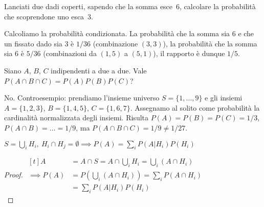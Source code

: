 
\begin{exercise}
	Lanciati due dadi coperti, sapendo che la somma esce~6, calcolare la probabilità che scoprendone uno esca~3.
\end{exercise}

\begin{solution}
	Calcoliamo la probabilità condizionata. La probabilità che la somma sia 6 e che un fissato dado sia 3 è $1/36$ (combinazione $(3,3)$), la probabilità che la somma sia 6 è $5/36$ (combinazioni da $(1,5)$ a $(5,1)$), il rapporto è dunque $1/5$.
\end{solution}

\begin{exercise}
	Siano $A$, $B$, $C$ indipendenti a due a due. Vale $P(A\cap B\cap C)=P(A)P(B)P(C)$?
\end{exercise}

\begin{solution}
	No. Controesempio: prendiamo l'insieme universo
	$S = \{1,\dots,9\}$
	e gli insiemi
	$A = \{1, 2, 3\}$,
	$B = \{1, 4, 5\}$,
	$C = \{1, 6, 7\}$.
	Assegnamo al solito come probabilità la cardinalità normalizzata degli insiemi.
	Risulta $P(A)=P(B)=P(C)=1/3$, $P(A\cap B)=\dots=1/9$, ma $P(A\cap B\cap C)=1/9\neq1/27$.
\end{solution}

\begin{theorem}
	$S=\bigcup_iH_i,\ H_i\cap H_j=\emptyset\implies P(A)=\sum_iP(A|H_i)P(H_i)$
\end{theorem}

\begin{proof}
	$\begin{aligned}[t]
		A &= A\cap S = A\cap \bigcup_iH_i = \bigcup_i(A\cap H_i) \\
		\implies P(A) &= P\left(\bigcup_i(A\cap H_i)\right) = \sum_i P(A\cap H_i) \\
		&= \sum_i P(A|H_i)P(H_i)
	\end{aligned}$\vspace{-1em}\\
\end{proof}
